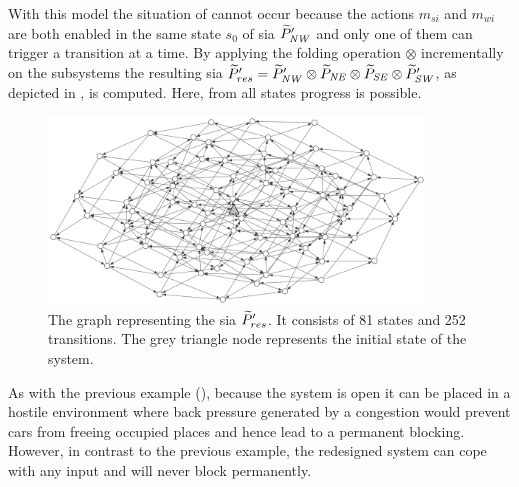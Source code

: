 With this model the situation of \Fig{\ref{fig_cross_sync_b}} cannot occur because the actions $m_{si}$ and $m_{wi}$ are both enabled in the same state $s_0$ of \gls{sia} $\widetilde{P}'_{\mathit{NW}}$ and only one of them can trigger a transition at a time.
By applying the folding operation $\otimes$ incrementally on the subsystems the resulting \gls{sia} $\widetilde{P}'_{res} = \widetilde{P}'_{\mathit{NW}} \otimes \widetilde{P}_{\mathit{NE}} \otimes \widetilde{P}_{\mathit{SE}} \otimes \widetilde{P}'_{\mathit{SW}}$, as depicted in \Fig{\ref{fig_cross_sia}}, is computed.
Here, from all states progress is possible.
\begin{figure}[bht]
    \TopFigSpace
    \centering
    \includegraphics[width=10cm]{fig/cross_sia.pdf}
    \CaptionFigSpace
    \caption{The graph representing the \gls{sia} $\widetilde{P}'_{res}$.
        It consists of 81 states and 252 transitions.
        The grey triangle node represents the initial state of the system.}
    \label{fig_cross_sia}
    \BotFigSpace
\end{figure}
As with the previous example (\Fig{\ref{fig_cross_proc_sia_dl}}), because the system is open it can be placed in a hostile environment where back pressure generated by a congestion would prevent cars from freeing occupied places and hence lead to a permanent blocking.
However, in contrast to the previous example, the redesigned system can cope with any input and will never block permanently.


